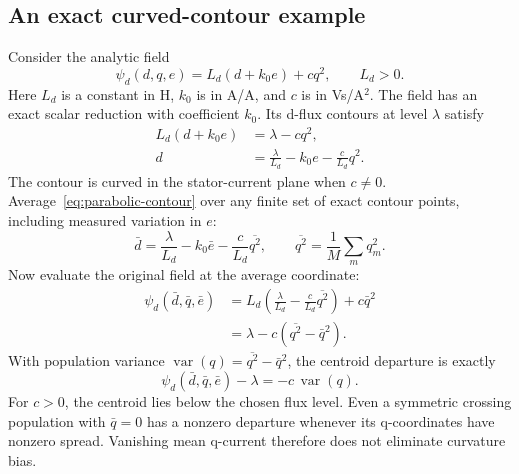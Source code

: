 \subsection{An exact curved-contour example}
Consider the analytic field
\begin{equation}\label{eq:parabolic-example}
\psi_d(d,q,e)=L_d(d+k_0e)+c q^2,
\qquad L_d>0.
\end{equation}
Here $L_d$ is a constant in H, $k_0$ is in A/A, and $c$ is in Vs/A$^2$. The field has an exact scalar reduction with coefficient $k_0$. Its d-flux contours at level $\lambda$ satisfy
\begin{align}
L_d(d+k_0e)&=\lambda-cq^2,\\
d&=\frac{\lambda}{L_d}-k_0e-\frac{c}{L_d}q^2.
\label{eq:parabolic-contour}
\end{align}
The contour is curved in the stator-current plane when $c\ne0$. Average~\eqref{eq:parabolic-contour} over any finite set of exact contour points, including measured variation in $e$:
\begin{equation}\label{eq:mean-parabola}
\bar d=\frac{\lambda}{L_d}-k_0\bar e
-\frac{c}{L_d}\overline{q^2},
\qquad
\overline{q^2}=\frac1M\sum_m q_m^2.
\end{equation}
Now evaluate the original field at the average coordinate:
\begin{align}
\psi_d(\bar d,\bar q,\bar e)
&=L_d\left(\frac{\lambda}{L_d}
-\frac{c}{L_d}\overline{q^2}\right)+c\bar q^2\\
&=\lambda-c(\overline{q^2}-\bar q^2).
\end{align}
With population variance $\operatorname{var}(q)=\overline{q^2}-\bar q^2$, the centroid departure is exactly
\begin{equation}\label{eq:variance-departure}
\boxed{\psi_d(\bar d,\bar q,\bar e)-\lambda=-c\,\operatorname{var}(q).}
\end{equation}
For $c>0$, the centroid lies below the chosen flux level. Even a symmetric crossing population with $\bar q=0$ has a nonzero departure whenever its q-coordinates have nonzero spread. Vanishing mean q-current therefore does not eliminate curvature bias.

